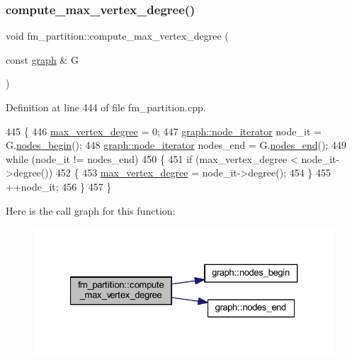 \subsubsection{\texorpdfstring{compute\+\_\+max\+\_\+vertex\+\_\+degree()}{compute\_max\_vertex\_degree()}}
{\footnotesize\ttfamily void fm\+\_\+partition\+::compute\+\_\+max\+\_\+vertex\+\_\+degree (\begin{DoxyParamCaption}\item[{const \mbox{\hyperlink{classgraph}{graph}} \&}]{G }\end{DoxyParamCaption})\hspace{0.3cm}{\ttfamily [protected]}}



Definition at line 444 of file fm\+\_\+partition.\+cpp.


\begin{DoxyCode}
445 \{
446     \mbox{\hyperlink{classfm__partition_ab6a4beaa10548ce9f1a0e8e441492ef9}{max\_vertex\_degree}} = 0;
447     \mbox{\hyperlink{classgraph_a2cb374b84c133ce13f94e73c3e5da7fa}{graph::node\_iterator}} node\_it = G.\mbox{\hyperlink{classgraph_aec053a4b509d1be804237a80044c54c0}{nodes\_begin}}();
448     \mbox{\hyperlink{classgraph_a2cb374b84c133ce13f94e73c3e5da7fa}{graph::node\_iterator}} nodes\_end = G.\mbox{\hyperlink{classgraph_abbf9c0cb5629e98e1142254911238173}{nodes\_end}}();
449     \textcolor{keywordflow}{while} (node\_it != nodes\_end)
450     \{
451     \textcolor{keywordflow}{if} (max\_vertex\_degree < node\_it->degree())
452     \{
453         \mbox{\hyperlink{classfm__partition_ab6a4beaa10548ce9f1a0e8e441492ef9}{max\_vertex\_degree}} = node\_it->degree();
454     \}
455     ++node\_it;
456     \}
457 \}
\end{DoxyCode}
Here is the call graph for this function\+:\nopagebreak
\begin{figure}[H]
\begin{center}
\leavevmode
\includegraphics[width=327pt]{classfm__partition_a5d0f409b6b1d554a62d67952236c7ce9_cgraph}
\end{center}
\end{figure}
